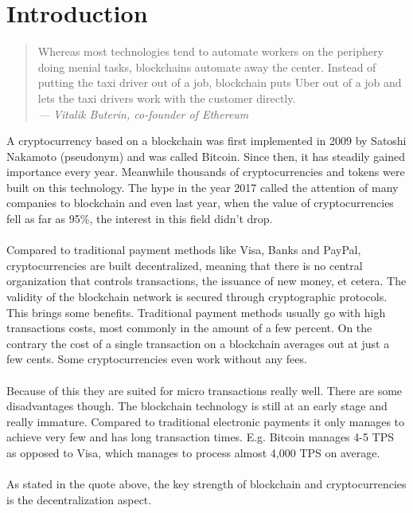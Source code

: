 \section{Introduction}
\begin{quote}
  Whereas most technologies tend to automate workers on the periphery doing menial tasks, blockchains automate away the center. Instead of putting the taxi driver out of a job, blockchain puts Uber out of a job and lets the taxi drivers work with the customer directly.
  \\
  {\textit{— Vitalik Buterin, co-founder of Ethereum}}
\end{quote}

A cryptocurrency based on a blockchain was first implemented in 2009 by Satoshi Nakamoto (pseudonym) and was called Bitcoin.
Since then, it has steadily gained importance every year.
Meanwhile thousands of cryptocurrencies and tokens were built on this technology.
The hype in the year 2017 called the attention of many companies to blockchain and even last year, when the value of cryptocurrencies fell as far as 95\%, the interest in this field didn't drop.
\\\\
Compared to traditional payment methods like Visa, Banks and PayPal, cryptocurrencies are built decentralized, meaning that there is no central organization that controls transactions, the issuance of new money, et cetera.
The validity of the blockchain  network is secured through cryptographic protocols.
This brings some benefits.
Traditional payment methods usually go with high transactions costs, most commonly in the amount of a few percent.
On the contrary the cost of a single transaction on a blockchain averages out at just a few cents\cite{ethereum-fee}.
Some cryptocurrencies even work without any fees.
\\\\
Because of this they are suited for micro transactions really well.
There are some disadvantages though.
The blockchain technology is still at an early stage and really immature.
Compared to traditional electronic payments it only manages to achieve very few  and has long transaction times.
E.g. Bitcoin manages 4-5 TPS\cite{bitcoinTPS} as opposed to Visa, which manages to process almost 4,000 TPS on average\cite{visa}.
\\\\
As stated in the quote above, the key strength of blockchain and cryptocurrencies is the decentralization aspect.
